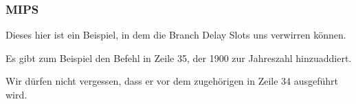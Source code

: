 \subsubsection{MIPS}


Dieses hier ist ein Beispiel, in dem die Branch Delay Slots uns verwirren können.

Es gibt zum Beispiel den Befehl  in Zeile 35, der 1900 zur Jahreszahl hinzuaddiert.

Wir dürfen nicht vergessen, dass er vor dem zugehörigen  in Zeile 34 ausgeführt wird.
